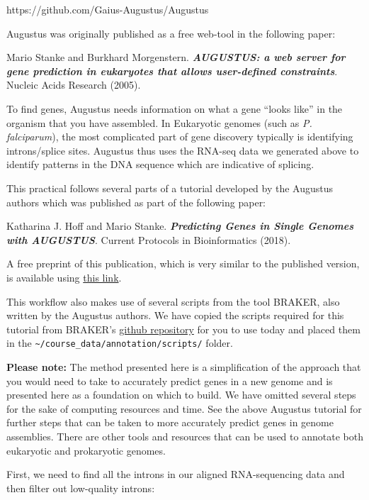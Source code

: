 \documentclass[11pt]{article}
\begin{document}
https://github.com/Gaius-Augustus/Augustus

Augustus was originally published as a free web-tool in the following
paper:

Mario Stanke and Burkhard Morgenstern. \textit{\textbf{AUGUSTUS: a web
server for gene prediction in eukaryotes that allows user-defined
constraints}}. Nucleic Acids Research (2005).

To find genes, Augustus needs information on what a gene ``looks like''
in the organism that you have assembled. In Eukaryotic genomes (such as
\textit{P. falciparum}), the most complicated part of gene discovery
typically is identifying introns/splice sites. Augustus thus uses the
RNA-seq data we generated above to identify patterns in the DNA sequence
which are indicative of splicing.

This practical follows several parts of a tutorial developed by the
Augustus authors which was published as part of the following paper:

Katharina J. Hoff and Mario Stanke. \textit{\textbf{Predicting Genes in
Single Genomes with AUGUSTUS}}. Current Protocols in Bioinformatics
(2018).

A free preprint of this publication, which is very similar to the
published version, is available using
\href{https://math-inf.uni-greifswald.de/storages/uni-greifswald/fakultaet/mnf/mathinf/stanke/augustus_wrp.pdf}{this
link}.

This workflow also makes use of several scripts from the tool BRAKER,
also written by the Augustus authors. We have copied the scripts
required for this tutorial from BRAKER's
\href{https://github.com/Gaius-Augustus/BRAKER}{github repository} for
you to use today and placed them in the
\texttt{\textasciitilde{}/course\_data/annotation/scripts/} folder.

\textbf{Please note:} The method presented here is a simplification of
the approach that you would need to take to accurately predict genes in
a new genome and is presented here as a foundation on which to build. We
have omitted several steps for the sake of computing resources and time.
See the above Augustus tutorial for further steps that can be taken to
more accurately predict genes in genome assemblies. There are other
tools and resources that can be used to annotate both eukaryotic and
prokaryotic genomes.

First, we need to find all the introns in our aligned RNA-sequencing
data and then filter out low-quality introns:
\end{document}
